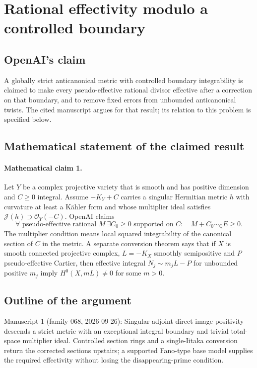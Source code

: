 \documentclass[11pt]{article}
\begin{document}
\section*{Rational effectivity modulo a controlled boundary}

\subsection{OpenAI's claim}
A globally strict anticanonical metric with controlled boundary integrability is claimed to make every pseudo-effective rational divisor effective after a correction on that boundary, and to remove fixed errors from unbounded anticanonical twists. The cited manuscript argues for that result; its relation to this problem is specified below.

\subsection{Mathematical statement of the claimed result}
\paragraph{Mathematical claim 1.} Let $Y$ be a complex projective variety that is smooth and has positive dimension and $C\ge0$ integral. Assume $-K_Y+C$ carries a singular Hermitian metric $h$ with curvature at least a Kähler form and whose multiplier ideal satisfies $\mathcal J(h)\supset\mathcal O_Y(-C)$. OpenAI claims
\[
\forall\text{ pseudo-effective rational }M\ \exists C_0\ge0\text{ supported on }C:\quad M+C_0\sim_{\mathbb Q}E\ge0.
\]
The multiplier condition means local squared integrability of the canonical section of $C$ in the metric. A separate conversion theorem says that if $X$ is smooth connected projective complex, $L=-K_X$ smoothly semipositive and $P$ pseudo-effective Cartier, then effective integral $N_j\sim m_jL-P$ for unbounded positive $m_j$ imply $H^0(X,mL)\ne0$ for some $m>0$.

\subsection{Outline of the argument}
Manuscript 1 (family 068, 2026-09-26): Singular adjoint direct-image positivity descends a strict metric with an exceptional integral boundary and trivial total-space multiplier ideal. Controlled section rings and a single-Iitaka conversion return the corrected sections upstairs; a supported Fano-type base model supplies the required effectivity without losing the disappearing-prime condition.
\end{document}
